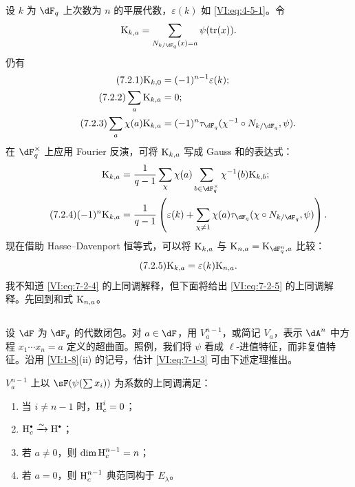 \subsection{}\label{VI:7-2}
设 $k$ 为 $\dF_q$ 上次数为 $n$ 的平展代数，$\varepsilon(k)$ 如 \eqref{VI:eq:4-5-1}。令
\[\kloos_{k,a}=\sum_{N_{k/\dF_q}(x)=a}\psi(\tr(x)).\]
仍有
\begin{align*}\tag{7.2.1}\label{VI:eq:7-2-1}
\kloos_{k,0}&=(-1)^{n-1}\varepsilon(k);\\
\tag{7.2.2}\label{VI:eq:7-2-2}
\sum_a\kloos_{k,a}&=0;\\
\tag{7.2.3}\label{VI:eq:7-2-3}
\sum_a\chi(a)\kloos_{k,a}
&=(-1)^n\tau_{\dF_q}(\chi^{-1}\circ N_{k/\dF_q},\psi).
\end{align*}
在 $\dF_q^\times$ 上应用 Fourier 反演，可将 $\textnormal{K}_{k,a}$ 写成 Gauss 和的表达式：
\begin{align*}
\kloos_{k,a}&=\frac1{q-1}\sum_\chi\chi(a)
 \sum_{b\in\dF_q^\times}\chi^{-1}(b)\kloos_{k,b};\\
\tag{7.2.4}\label{VI:eq:7-2-4}
(-1)^n\kloos_{k,a}
&=\frac1{q-1}\left(\varepsilon(k)+\sum_{\chi\ne1}\chi(a)
 \tau_{\dF_q}(\chi\circ N_{k/\dF_q},\psi)\right).
\end{align*}
现在借助 Hasse--Davenport 恒等式，可以将 $\textnormal{K}_{k,a}$ 与
$\kloos_{n,a}=\kloos_{\dF_q^n,a}$ 比较：
\begin{equation*}\tag{7.2.5}\label{VI:eq:7-2-5}
\textnormal{K}_{k,a}=\varepsilon(k)\textnormal{K}_{n,a}.
\end{equation*}
我不知道 \eqref{VI:eq:7-2-4} 的上同调解释，但下面将给出 \eqref{VI:eq:7-2-5} 的上同调解释。先回到和式 $\textnormal{K}_{n,a}$。

\subsection{}\label{VI:7-3}
设 $\dF$ 为 $\dF_q$ 的代数闭包。对 $a\in\dF$，用 $V_a^{n-1}$，或简记 $V_a$，表示 $\dA^n$ 中方程 $x_1\cdots x_n=a$ 定义的超曲面。照例，我们将 $\psi$ 看成 $\ell$-进值特征，而非复值特征。沿用 \ref{VI:1-8}(ii) 的记号，估计 \eqref{VI:eq:7-1-3} 可由下述定理推出。

\begin{theorem_}\label{VI:7-4}
$V_a^{n-1}$ 上以 $\sF(\psi(\sum x_i))$ 为系数的上同调满足：
\begin{enumerate}[\indent (i)]
\item 当 $i\ne n-1$ 时，$\operatorname{H}_c^i=0$；
\item $\h_c^\bullet\iso\h^\bullet$；
\item 若 $a\ne0$，则 $\dim\operatorname{H}_c^{n-1}=n$；
\item 若 $a=0$，则 $\operatorname{H}_c^{n-1}$ 典范同构于 $E_\lambda$。
\end{enumerate}
\end{theorem_}

